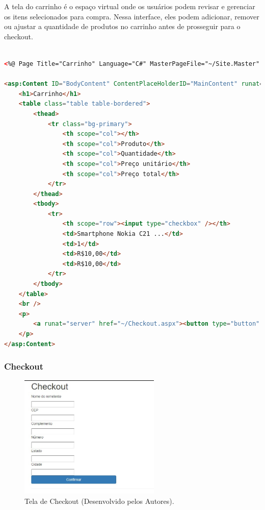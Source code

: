 \documentclass[
	12pt,				%
	openright,			%
	twoside,			%
	a4paper,			%
	english,			%
	brazil				%
	]{abntex2}
\begin{document}
A tela do carrinho é o espaço virtual onde os usuários podem revisar e gerenciar os itens selecionados para compra. Nessa interface, eles podem adicionar, remover ou ajustar a quantidade de produtos no carrinho antes de prosseguir para o checkout.

\begin{lstlisting}[language=HTML, caption=Tela de Carrinho em ASPX, label=lst:aspx]

<%@ Page Title="Carrinho" Language="C#" MasterPageFile="~/Site.Master" AutoEventWireup="true" CodeBehind="Carrinho.aspx.cs" Inherits="UNIPPIMVIII.Carrinho" %>

<asp:Content ID="BodyContent" ContentPlaceHolderID="MainContent" runat="server">
    <h1>Carrinho</h1>
    <table class="table table-bordered">
        <thead>
            <tr class="bg-primary">
                <th scope="col"></th>
                <th scope="col">Produto</th>
                <th scope="col">Quantidade</th>
                <th scope="col">Preço unitário</th>
                <th scope="col">Preço total</th>
            </tr>
        </thead>
        <tbody>
            <tr>
                <th scope="row"><input type="checkbox" /></th>
                <td>Smartphone Nokia C21 ...</td>
                <td>1</td>
                <td>R$10,00</td>
                <td>R$10,00</td>
            </tr>            
        </tbody>
    </table>
    <br />
    <p>
        <a runat="server" href="~/Checkout.aspx"><button type="button" class="btn btn-primary" style="width:30%;height:auto;">Confirmar</button></a>
    </p>
</asp:Content>


\end{lstlisting}

\subsubsection{Checkout}

\begin{figure}[htb]
    \centering
    \includegraphics[width=0.6\textwidth]{img/checkout-desktop-print.jpg}
    \caption{Tela de Checkout (Desenvolvido pelos Autores).}
    \label{fig:tela-de-checkout-desktop}
\end{figure}
\end{document}
